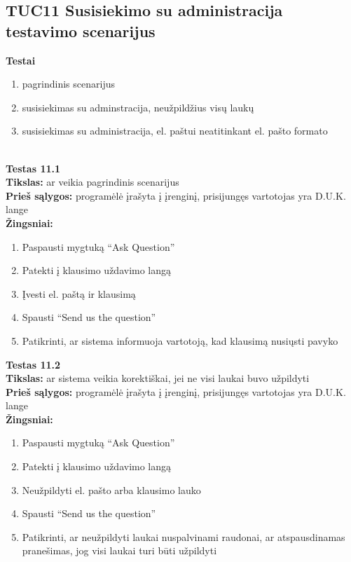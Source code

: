 \documentclass{VUMIFPSkursinis}
\begin{document}
	\subsection{TUC11 Susisiekimo su administracija testavimo scenarijus}
		\textbf{Testai}
		\begin{enumerate}[noitemsep,topsep=0pt]
			\item pagrindinis scenarijus
			\item susisiekimas su adminstracija, neužpildžius visų laukų
			\item susisiekimas su administracija, el. paštui neatitinkant el. pašto formato
		\end{enumerate}
		\textbf{}\\
		\textbf{Testas 11.1}\\
		\textbf{Tikslas:} ar veikia pagrindinis scenarijus\\
		\textbf{Prieš sąlygos:} programėlė įrašyta į įrenginį, prisijungęs vartotojas yra D.U.K. lange\\
		\textbf{Žingsniai:}
		\begin{enumerate}[noitemsep,topsep=0pt]
			\item Paspausti mygtuką “Ask Question”
			\item Patekti į klausimo uždavimo langą
			\item Įvesti el. paštą ir klausimą
			\item Spausti “Send us the question”
			\item Patikrinti, ar sistema informuoja vartotoją, kad klausimą nusiųsti pavyko
		\end{enumerate}
		\textbf{Testas 11.2}\\
		\textbf{Tikslas:} ar sistema veikia korektiškai, jei ne visi laukai buvo užpildyti\\
		\textbf{Prieš sąlygos:} programėlė įrašyta į įrenginį, prisijungęs vartotojas yra D.U.K. lange\\
		\textbf{Žingsniai:}
		\begin{enumerate}[noitemsep,topsep=0pt]
			\item Paspausti mygtuką “Ask Question”
			\item Patekti į klausimo uždavimo langą
			\item Neužpildyti el. pašto arba klausimo lauko
			\item Spausti “Send us the question”
			\item Patikrinti, ar neužpildyti laukai nuspalvinami raudonai, ar atspausdinamas pranešimas, jog visi laukai turi būti užpildyti
		\end{enumerate}
\end{document}
